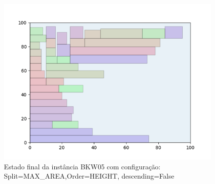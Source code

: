\begin{figure}[H]
    \centering
    \caption[]{Estado final da instância BKW05 com configuração: Split=MAX_AREA,Order=HEIGHT, descending=False}
    \label{fig:bkw05-max_area-height-false}
    \includegraphics[scale=0.5]{output/figures/bkw/bkw05/max_area/height/false/00}
\end{figure}